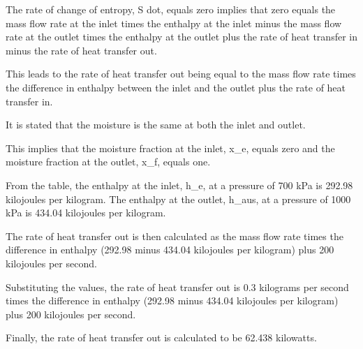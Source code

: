 The rate of change of entropy, S dot, equals zero implies that zero equals the mass flow rate at the inlet times the enthalpy at the inlet minus the mass flow rate at the outlet times the enthalpy at the outlet plus the rate of heat transfer in minus the rate of heat transfer out.

This leads to the rate of heat transfer out being equal to the mass flow rate times the difference in enthalpy between the inlet and the outlet plus the rate of heat transfer in.

It is stated that the moisture is the same at both the inlet and outlet.

This implies that the moisture fraction at the inlet, x_e, equals zero and the moisture fraction at the outlet, x_f, equals one.

From the table, the enthalpy at the inlet, h_e, at a pressure of 700 kPa is 292.98 kilojoules per kilogram. The enthalpy at the outlet, h_aus, at a pressure of 1000 kPa is 434.04 kilojoules per kilogram.

The rate of heat transfer out is then calculated as the mass flow rate times the difference in enthalpy (292.98 minus 434.04 kilojoules per kilogram) plus 200 kilojoules per second.

Substituting the values, the rate of heat transfer out is 0.3 kilograms per second times the difference in enthalpy (292.98 minus 434.04 kilojoules per kilogram) plus 200 kilojoules per second.

Finally, the rate of heat transfer out is calculated to be 62.438 kilowatts.